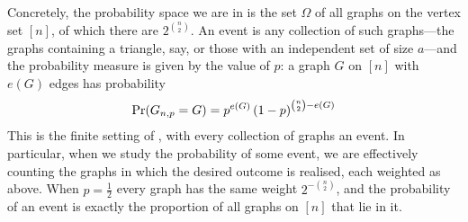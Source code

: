 Concretely, the probability space we are in is the set $\Omega$ of all graphs on the vertex set $[n]$, of which there are $2^{\binom{n}{2}}$. An event is any collection of such graphs---the graphs containing a triangle, say, or those with an independent set of size $a$---and the probability measure is given by the value of $p$: a graph $G$ on $[n]$ with $e(G)$ edges has probability
\begin{align*}
    \Pr\!\left( G_{n, p} = G \right) = p^{e(G)} \left( 1 - p \right)^{\binom{n}{2} - e(G)}
\end{align*}
This is the finite setting of , with every collection of graphs an event. In particular, when we study the probability of some event, we are effectively counting the graphs in which the desired outcome is realised, each weighted as above. When $p = \frac{1}{2}$ every graph has the same weight $2^{-\binom{n}{2}}$, and the probability of an event is exactly the proportion of all graphs on $[n]$ that lie in it.

